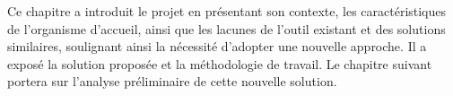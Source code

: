 Ce chapitre a introduit le projet en présentant son contexte, les caractéristiques de l’organisme d’accueil, ainsi que les lacunes de l’outil existant et des solutions similaires, soulignant ainsi la nécessité d’adopter une nouvelle approche. Il a exposé la solution proposée et la méthodologie de travail. Le chapitre suivant portera sur l’analyse préliminaire de cette nouvelle solution.
